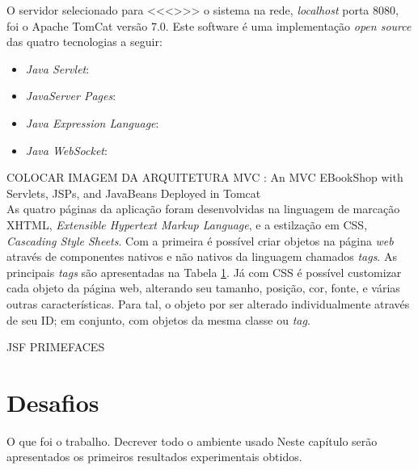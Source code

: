 \indent O servidor selecionado para <<<>>> o sistema na rede, \textit{localhost} porta 8080, foi o Apache TomCat versão 7.0. Este software é uma implementação \textit{open source} das quatro tecnologias \cite{oracle14} a seguir:
\begin{itemize}
	\item \textit{Java Servlet}: 
	\item \textit{JavaServer Pages}:
	\item \textit{Java Expression Language}:
	\item \textit{Java WebSocket}:
\end{itemize}

\indent COLOCAR IMAGEM DA ARQUITETURA MVC : An MVC EBookShop with Servlets, JSPs, and JavaBeans Deployed in Tomcat  \cite{chuan11} \\

\indent As quatro páginas da aplicação foram desenvolvidas na linguagem de marcação XHTML, \textit{Extensible Hypertext Markup Language}, e a estilzação em CSS, \textit{Cascading Style Sheets}. Com a primeira é possível criar objetos na página \textit{web} através de componentes nativos e não nativos da linguagem chamados \textit{tags}. As principais \textit{tags} são apresentadas na Tabela \ref{}. Já com CSS é possível customizar cada objeto da página web, alterando seu tamanho, posição, cor, fonte, e várias outras características. Para tal, o objeto por ser alterado individualmente através de seu ID; em conjunto, com objetos da mesma classe ou \textit{tag}. \\

\indent 

JSF
PRIMEFACES





\section{Desafios}
 

O que foi o trabalho. 
Decrever todo o ambiente usado
Neste capítulo serão apresentados os primeiros resultados experimentais obtidos.
